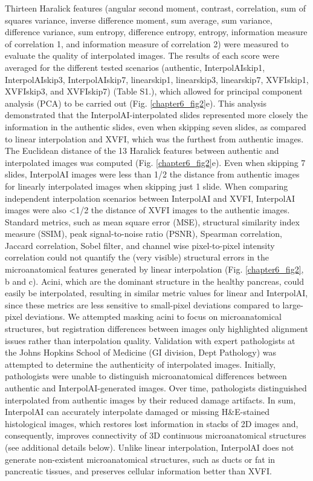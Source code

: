 \begin{refsection}
    Thirteen Haralick features (angular second moment, contrast, correlation, sum of squares variance, inverse difference moment, sum average, sum variance, difference variance, sum entropy, difference entropy, entropy, information measure of correlation 1, and information measure of correlation 2) were measured to evaluate the quality of interpolated images\cite{brynolfsson2017a,haralick1973a}. The results of each score were averaged for the different tested scenarios (authentic, InterpolAIskip1, InterpolAIskip3, InterpolAIskip7, linearskip1, linearskip3, linearskip7, XVFIskip1, XVFIskip3, and XVFIskip7) (Table S1.), which allowed for principal component analysis (PCA) to be carried out (Fig. \ref{chapter6_fig2}e). This analysis demonstrated that the InterpolAI-interpolated slides represented more closely the information in the authentic slides, even when skipping seven slides, as compared to linear interpolation and XVFI, which was the furthest from authentic images. The Euclidean distance of the 13 Haralick features between authentic and interpolated images was computed (Fig. \ref{chapter6_fig2}e). Even when skipping 7 slides, InterpolAI images were less than 1/2 the distance from authentic images for linearly interpolated images when skipping just 1 slide. When comparing independent interpolation scenarios between InterpolAI and XVFI, InterpolAI images were also <1/2 the distance of XVFI images to the authentic images.  
    Standard metrics, such as mean square error (MSE), structural similarity index measure (SSIM), peak signal-to-noise ratio (PSNR), Spearman correlation, Jaccard correlation, Sobel filter, and channel wise pixel-to-pixel intensity correlation could not quantify the (very visible) structural errors in the microanatomical features generated by linear interpolation (Fig. \ref{chapter6_fig2}, b and c). Acini, which are the dominant structure in the healthy pancreas, could easily be interpolated, resulting in similar metric values for linear and InterpolAI, since these metrics are less sensitive to small-pixel deviations compared to large-pixel deviations. We attempted masking acini to focus on microanatomical structures, but registration differences between images only highlighted alignment issues rather than interpolation quality.
    Validation with expert pathologists at the Johns Hopkins School of Medicine (GI division, Dept Pathology) was attempted to determine the authenticity of interpolated images. Initially, pathologists were unable to distinguish microanatomical differences between authentic and InterpolAI-generated images. Over time, pathologists distinguished interpolated from authentic images by their reduced damage artifacts.
    In sum, InterpolAI can accurately interpolate damaged or missing H\&E-stained histological images, which restores lost information in stacks of 2D images and, consequently, improves connectivity of 3D continuous microanatomical structures (see additional details below). Unlike linear interpolation, InterpolAI does not generate non-existent microanatomical structures, such as ducts or fat in pancreatic tissues, and preserves cellular information better than XVFI.


\end{refsection}
